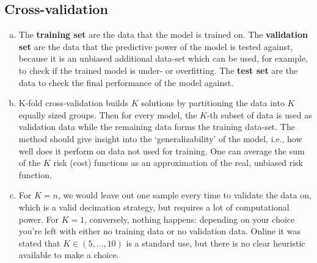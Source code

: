 \documentclass{article}
\begin{document}
\subsection{Cross-validation}
\begin{enumerate}[(a)]
    \item The \textbf{training set} are the data that the model is trained on. The \textbf{validation set} are the data that the predictive power of the model is tested against, because it is an unbiased additional data-set which can be used, for example, to check if the trained model is under- or overfitting. The \textbf{test set} are the data to check the final performance of the model against.
    \item K-fold cross-validation builds $K$ solutions by partitioning the data into $K$ equally sized groups. Then for every model, the $K$-th subset of data is used as validation data while the remaining data forms the training data-set. The method should give insight into the `generalizability' of the model, i.e., how well does it perform on data not used for training. One can average the sum of the $K$ risk (cost) functions as an approximation of the real, unbiased risk function.
    \item For $K=n$, we would leave out one sample every time to validate the data on, which is a valid decimation strategy, but requires a lot of computational power. For $K=1$, conversely, nothing happens: depending on your choice you're left with either no training data or no validation data. Online it was stated that $K\in (5,\dots,10)$ is a standard use, but there is no clear heuristic available to make a choice.
\end{enumerate}
\end{document}
